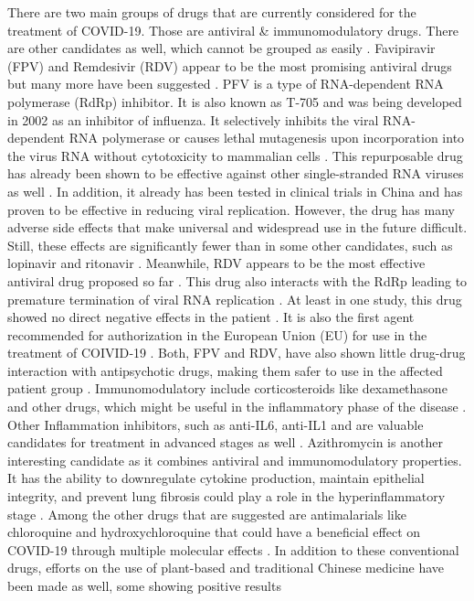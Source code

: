 There are two main groups of drugs that are currently considered for the treatment of COVID-19. Those are antiviral \& immunomodulatory drugs. There are other candidates as well, which cannot be grouped as easily \cite{Bartoli_2021}. Favipiravir (FPV) and Remdesivir (RDV) appear to be the most promising antiviral drugs but many more have been suggested \cite{Yi_2020, Mohamed_2021, Sreekanth_Reddy_2020}. PFV is a type of RNA-dependent RNA polymerase (RdRp) inhibitor. It is also known as T-705 and was being developed in 2002 as an inhibitor of influenza. It selectively inhibits the viral RNA-dependent RNA polymerase or causes lethal mutagenesis upon incorporation into the virus RNA without cytotoxicity to mammalian cells \cite{Ghasemnejad_Berenji_2020}. This repurposable drug has already been shown to be effective against other single-stranded RNA viruses as well \cite{Ghasemnejad_Berenji_2020, Sreekanth_Reddy_2020}. In addition, it already has been tested in clinical trials in China and has proven to be effective in reducing viral replication. However, the drug has many adverse side effects that make universal and widespread use in the future difficult. Still, these effects are significantly fewer than in some other candidates, such as lopinavir and ritonavir \cite{Ghasemnejad_Berenji_2020}.
Meanwhile, RDV appears to be the most effective antiviral drug proposed so far \cite{Bartoli_2021}. This drug also interacts with the RdRp leading to premature termination of viral RNA replication \cite{Sreekanth_Reddy_2020}. At least in one study, this drug showed no direct negative effects in the patient \cite{Holshue_2020}. It is also the first agent recommended for authorization in the European Union (EU) for use in the treatment of COIVID‐19 \cite{Sreekanth_Reddy_2020}.
Both, FPV and RDV, have also shown little drug-drug interaction with antipsychotic drugs, making them safer to use in the affected patient group \cite{Plasencia_Garc_a_2021}.
Immunomodulatory include corticosteroids like dexamethasone and other drugs, which might be useful in the inflammatory phase of the disease \cite{Bartoli_2021}. Other Inflammation inhibitors, such as anti-IL6, anti-IL1 and are valuable candidates for treatment in advanced stages as well \cite{Stasi_2020, Saeed_2021}.
Azithromycin is another interesting candidate as it combines antiviral and immunomodulatory properties. It has the ability to downregulate cytokine production, maintain epithelial integrity, and prevent lung fibrosis could play a role in the hyperinflammatory stage \cite{Echeverr_a_Esnal_2020}.
Among the other drugs that are suggested are antimalarials like chloroquine and hydroxychloroquine that could have a beneficial effect on COVID-19 through multiple molecular effects \cite{Ong_2020}. In addition to these conventional drugs, efforts on the use of plant-based and traditional Chinese medicine have been made as well, some showing positive results \cite{Yi_2020, Boozari_2020, Adhikari_2020}
\\

